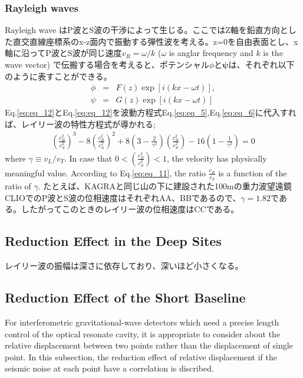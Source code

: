 \subsubsection{Rayleigh waves}
Rayleigh wave はP波とS波の干渉によって生じる\cite{}。ここではZ軸を鉛直方向とした直交直線座標系のx-z面内で振動する弾性波を考える。z=0を自由表面とし、x軸に沿ってP波とS波が同じ速度$v_{R}=\omega/k$ ($\omega$ is anglar frequency and $k$ is the wave vector) で伝搬する場合を考えると、ポテンシャル$\phi$と$\bm{\psi}$は、それぞれ以下のように表すことができる。
\begin{eqnarray}
  \phi &=& F(z)\exp[i(kx-\omega{t})],\label{eq:eq_12}\\
  \psi &=& G(z)\exp[i(kx-\omega{t})]\label{eq:eq_13}
\end{eqnarray}
Eq.\ref{eq:eq_12}とEq.\ref{eq:eq_12}を波動方程式Eq.\ref{eq:eq_5},Eq.\ref{eq:eq_6}に代入すれば、レイリー波の特性方程式が導かれる;
\begin{eqnarray}\label{eq:eq_11}
\left(\frac{c_{R}^{2}}{c_{S}^{2}}\right)^{3}-8\left(\frac{c_{R}^{2}}{c_{S}^{2}}\right)^{2}+8\left(3-\frac{2}{\gamma^2}\right)\left(\frac{c_{R}^{2}}{c_{S}^{2}}\right)-16\left(1-\frac{1}{\gamma^2}\right)=0
\end{eqnarray}
where $\gamma\equiv v_{L}/v_{T}$. In case that $0 < (\frac{c_{R}^2}{c_{S}^2}) <1$, the velocity has physically meaningful value. According to Eq.\ref{eq:eq_11}, the ratio $\frac{c_R}{c_S}$ is a function of the ratio of $\gamma$. たとえば、KAGRAと同じ山の下に建設された100mの重力波望遠鏡CLIOでのP波とS波の位相速度はそれぞれAA、BBである\cite{takemoto2003}ので、$\gamma = 1.82 $である。したがってこのときのレイリー波の位相速度はCCである。


\subsection{Reduction Effect in the Deep Sites}
レイリー波の振幅は深さに依存しており、深いほど小さくなる。



\subsection{Reduction Effect of the Short Baseline}
For interferometric gravitational-wave detectors which need a precise length control of the optical resonate cavity, it is appropriate to consider about the relative displacement between two points rather than the displacement of single point. In this subsection, the reduction effect of relative displacement if the seismic noise at each point have a correlation is discribed.

